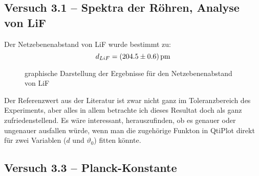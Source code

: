 \subsection{Versuch 3.1 -- Spektra der R\"ohren, Analyse von LiF}
\label{subsec:spektra}

Der Netzebenenabstand von LiF wurde bestimmt zu:
\begin{equation*}
    d_{LiF} = \SI{204.5 \pm 0.6}{\pico\meter}
\end{equation*}

\pgfplotsset{try min ticks = 2}
\begin{figure}[ht!]
    \centering
    \caption{graphische Darstellung der Ergebnisse f\"ur den Netzebenenabstand von LiF}
    \label{fig:resultsLiF}
\end{figure}

Der Referenzwert aus der Literatur ist  zwar nicht ganz im Toleranzbereich des
Experiments, aber alles  in allem betrachte ich dieses Resultat  doch als ganz
zufriedenstellend. Es w\"are  interessant, herauszufinden, ob es  genauer oder
ungenauer  ausfallen w\"urde,  wenn man  die zugeh\"orige  Funkton in  QtiPlot
direkt f\"ur zwei Variablen ($d$ und $\vartheta_0$) fitten k\"onnte.


\subsection{Versuch 3.3 -- Planck-Konstante}
\label{subsec:planck}

